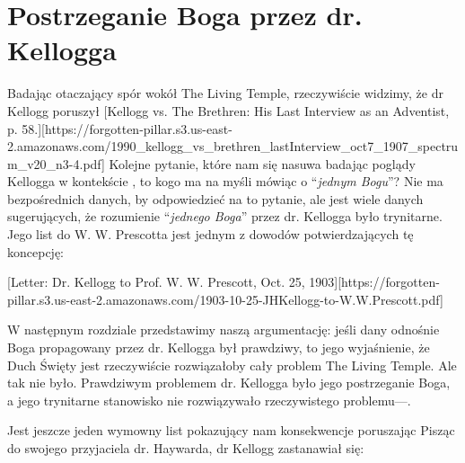 \section*{Postrzeganie Boga przez dr. Kellogga}

Badając otaczający spór wokół The Living Temple, rzeczywiście widzimy, że dr Kellogg poruszył [Kellogg vs. The Brethren: His Last Interview as an Adventist, p. 58.][https://forgotten-pillar.s3.us-east-2.amazonaws.com/1990\_kellogg\_vs\_brethren\_lastInterview\_oct7\_1907\_spectrum\_v20\_n3-4.pdf] Kolejne pytanie, które nam się nasuwa badając poglądy Kellogga w kontekście , to kogo ma na myśli mówiąc o “\textit{jednym Bogu}”? Nie ma bezpośrednich danych, by odpowiedzieć na to pytanie, ale jest wiele danych sugerujących, że rozumienie “\textit{jednego Boga}” przez dr. Kellogga było trynitarne. Jego list do W. W. Prescotta jest jednym z dowodów potwierdzających tę koncepcję:

[Letter: Dr. Kellogg to Prof. W. W. Prescott, Oct. 25, 1903][https://forgotten-pillar.s3.us-east-2.amazonaws.com/1903-10-25-JHKellogg-to-W.W.Prescott.pdf]

W następnym rozdziale przedstawimy naszą argumentację: jeśli dany  odnośnie Boga propagowany przez dr. Kellogga był prawdziwy, to jego wyjaśnienie, że Duch Święty jest  rzeczywiście rozwiązałoby cały problem The Living Temple. Ale tak nie było. Prawdziwym problemem dr. Kellogga było jego postrzeganie Boga, a jego trynitarne stanowisko nie rozwiązywało rzeczywistego problemu—.

Jest jeszcze jeden wymowny list pokazujący nam konsekwencje poruszając  Pisząc do swojego przyjaciela dr. Haywarda, dr Kellogg zastanawiał się:

